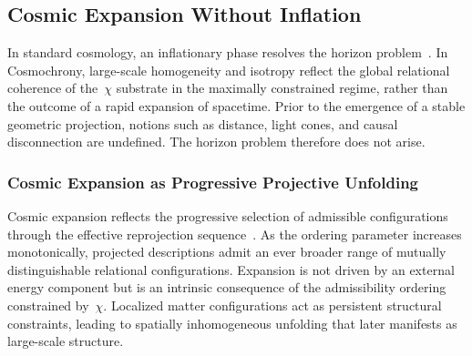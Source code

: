 \subsection{Cosmic Expansion Without Inflation}
  \label{subsec:expansion-without-inflation}

  In standard cosmology, an inflationary phase resolves the horizon
  problem~\cite{Guth1981,Linde1982}.
  In Cosmochrony, large-scale homogeneity and isotropy reflect the global
  relational coherence of the~$\chi$ substrate in the maximally constrained
  regime, rather than the outcome of a rapid expansion of spacetime.
  Prior to the emergence of a stable geometric projection, notions such as
  distance, light cones, and causal disconnection are undefined.
  The horizon problem therefore does not arise.

  \subsubsection*{Cosmic Expansion as Progressive Projective Unfolding}
    \label{subsec:expansion-projective-unfolding}

    Cosmic expansion reflects the progressive selection of admissible
    configurations through the effective reprojection
    sequence~\cite{Friedmann1922}.
    As the ordering parameter increases monotonically, projected descriptions
    admit an ever broader range of mutually distinguishable relational
    configurations.
    Expansion is not driven by an external energy component but is an
    intrinsic consequence of the admissibility ordering constrained by~$\chi$.
    Localized matter configurations act as persistent structural constraints,
    leading to spatially inhomogeneous unfolding that later manifests as
    large-scale structure.
